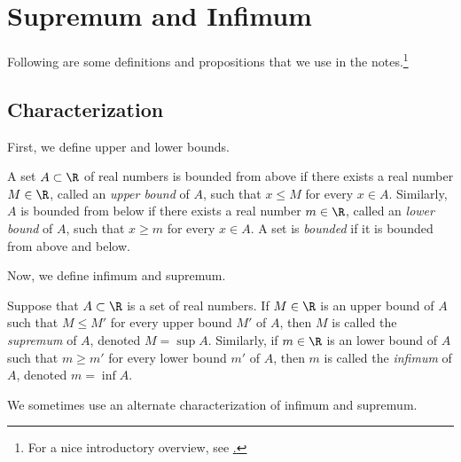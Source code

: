 \documentclass{article} %
\begin{document}


 
\newpage 
\appendix

\section{Supremum and Infimum}

Following are some definitions and propositions that we use in the notes.\footnote{For a nice introductory overview, see \href{https://www.math.ucdavis.edu/~hunter/m125b/ch2.pdf}.}

\subsection{Characterization}

First, we define upper and lower bounds.
\begin{definition}
A set $A \subset \R$ of real numbers is bounded from above if there exists a real number $M \in \R$, called an \textit{upper bound} of $A$, such that $x \leq M$ for every $x \in A$.  Similarly, $A$  is bounded from below if there exists a real number $m \in \R$, called an \textit{lower bound} of $A$, such that $x \geq m$ for every $x \in A$.  A set is \textit{bounded} if it is bounded from above and below.
\label{def:upper_and_lower_bound}	
\end{definition}


Now, we define infimum and supremum.
\begin{definition}
Suppose that $A \subset \R$ is a set of real numbers. If $M \in \R$ is an upper bound of $A$ such that $M \leq M'$ for every upper bound $M'$ of $A$, then $M$ is called the \textit{supremum} of $A$, denoted $M=\sup A$.   Similarly, if $m \in \R$ is an lower bound of $A$ such that $m \geq m'$ for every lower bound $m'$ of $A$, then $m$ is called the \textit{infimum} of $A$, denoted $m=\inf A$.\label{def:supremum_and_infimum}	
\end{definition}

We sometimes use an alternate characterization of infimum and supremum.
\end{document}
